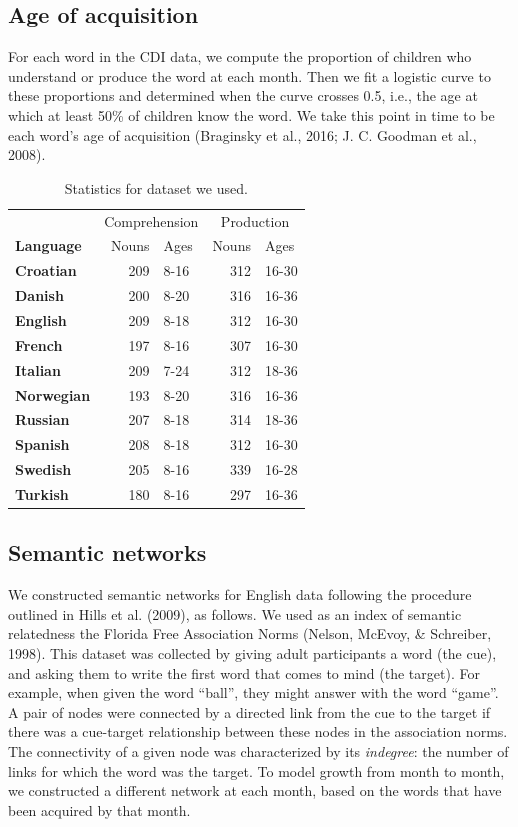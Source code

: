 \documentclass[english,floatsintext,man]{apa6}
\theoremstyle{definition}
\theoremstyle{definition}
\theoremstyle{definition}
\theoremstyle{remark}
\begin{document}
\subsection{Age of acquisition}\label{age-of-acquisition}

For each word in the CDI data, we compute the proportion of children who
understand or produce the word at each month. Then we fit a logistic
curve to these proportions and determined when the curve crosses 0.5,
i.e., the age at which at least 50\% of children know the word. We take
this point in time to be each word's age of acquisition (Braginsky et
al., 2016; J. C. Goodman et al., 2008).

\begin{table}

\caption{\label{tab:stats}Statistics for dataset we used.}
\centering
\begin{tabular}[t]{>{\bfseries}lrlrl}
\toprule
\multicolumn{1}{c}{} & \multicolumn{2}{c}{Comprehension} & \multicolumn{2}{c}{Production} \\
\cmidrule(l{2pt}r{2pt}){2-3} \cmidrule(l{2pt}r{2pt}){4-5}
Language & Nouns & Ages & Nouns & Ages\\
\midrule
Croatian & 209 & 8-16 & 312 & 16-30\\
Danish & 200 & 8-20 & 316 & 16-36\\
English & 209 & 8-18 & 312 & 16-30\\
French & 197 & 8-16 & 307 & 16-30\\
Italian & 209 & 7-24 & 312 & 18-36\\
Norwegian & 193 & 8-20 & 316 & 16-36\\
Russian & 207 & 8-18 & 314 & 18-36\\
Spanish & 208 & 8-18 & 312 & 16-30\\
Swedish & 205 & 8-16 & 339 & 16-28\\
Turkish & 180 & 8-16 & 297 & 16-36\\
\bottomrule
\end{tabular}
\end{table}

\subsection{Semantic networks}\label{semantic-networks}

We constructed semantic networks for English data following the
procedure outlined in Hills et al. (2009), as follows. We used as an
index of semantic relatedness the Florida Free Association Norms
(Nelson, McEvoy, \& Schreiber, 1998). This dataset was collected by
giving adult participants a word (the cue), and asking them to write the
first word that comes to mind (the target). For example, when given the
word \enquote{ball}, they might answer with the word \enquote{game}. A
pair of nodes were connected by a directed link from the cue to the
target if there was a cue-target relationship between these nodes in the
association norms. The connectivity of a given node was characterized by
its \emph{indegree}: the number of links for which the word was the
target. To model growth from month to month, we constructed a different
network at each month, based on the words that have been acquired by
that month.
\end{document}
